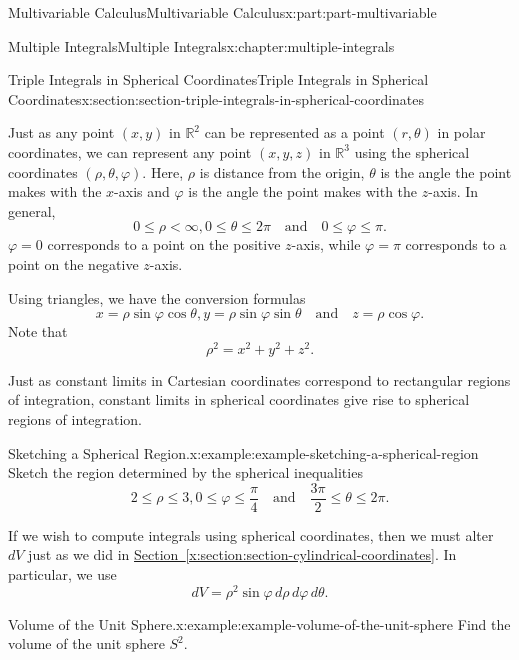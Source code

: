 \documentclass[twoside,10pt,]{tufte-book}
\newcommand{\xreffont}{\relax}
\numberwithin{equation}{part}
\newcommand{\qq}[1]{\quad\text{#1}\quad}
\newcommand{\lt}{<}
\begin{document}
\begin{partptx}{Multivariable Calculus}{}{Multivariable Calculus}{}{}{x:part:part-multivariable}
\begin{chapterptx}{Multiple Integrals}{}{Multiple Integrals}{}{}{x:chapter:multiple-integrals}
\begin{sectionptx}{Triple Integrals in Spherical Coordinates}{}{Triple Integrals in Spherical Coordinates}{}{}{x:section:section-triple-integrals-in-spherical-coordinates}
\par
Just as any point \((x,y)\) in \(\mathbb{R}^{2}\) can be represented as a point \((r,\theta)\) in polar coordinates, we can represent any point \((x,y,z)\) in \(\mathbb{R}^{3}\) using the spherical coordinates \((\rho, \theta,\varphi)\). Here, \(\rho\) is distance from the origin, \(\theta\) is the angle the point makes with the \(x\)-axis and \(\varphi\) is the angle the point makes with the \(z\)-axis. In general,%
\begin{equation*}
0\leq\rho\lt\infty, 0\leq\theta\leq2\pi\qq{and} 0\leq \varphi\leq \pi\text{.}
\end{equation*}
\(\varphi = 0\) corresponds to a point on the positive \(z\)-axis, while \(\varphi = \pi\) corresponds to a point on the negative \(z\)-axis.%
\par
Using triangles, we have the conversion formulas%
\begin{equation*}
x = \rho\sin\varphi\cos\theta, y = \rho\sin\varphi\sin\theta\qq{and} z = \rho\cos\varphi\text{.}
\end{equation*}
Note that%
\begin{equation*}
\rho^{2} = x^{2} + y^{2} + z^{2}\text{.}
\end{equation*}
%
\par
Just as constant limits in Cartesian coordinates correspond to rectangular regions of integration, constant limits in spherical coordinates give rise to spherical regions of integration.%
\begin{example}{Sketching a Spherical Region.}{x:example:example-sketching-a-spherical-region}%
Sketch the region determined by the spherical inequalities%
\begin{equation*}
2\leq \rho\leq 3, 0\leq \varphi\leq \frac{\pi}{4} \qq{and} \frac{3\pi}{2}\leq \theta\leq 2\pi\text{.}
\end{equation*}
%
\end{example}
If we wish to compute integrals using spherical coordinates, then we must alter \(dV\) just as we did in \hyperref[x:section:section-cylindrical-coordinates]{Section~{\xreffont\ref{x:section:section-cylindrical-coordinates}}}. In particular, we use%
\begin{equation*}
dV = \rho^{2}\sin\varphi\,d\rho\,d\varphi\,d\theta\text{.}
\end{equation*}
%
\begin{example}{Volume of the Unit Sphere.}{x:example:example-volume-of-the-unit-sphere}%
Find the volume of the unit sphere \(S^{2}\).%
\par\smallskip%

\end{example}
\end{sectionptx}
\end{chapterptx}
\end{partptx}
\end{document}
